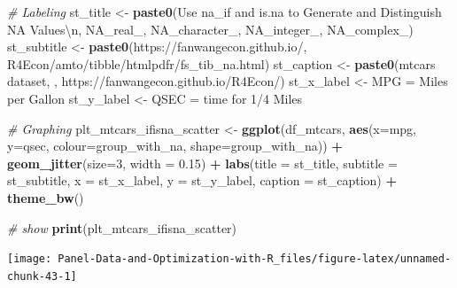 \documentclass[
]{book}
\newenvironment{Shaded}{\begin{snugshade}}{\end{snugshade}}
\newcommand{\CharTok}[1]{\textcolor[rgb]{0.31,0.60,0.02}{#1}}
\newcommand{\CommentTok}[1]{\textcolor[rgb]{0.56,0.35,0.01}{\textit{#1}}}
\newcommand{\DataTypeTok}[1]{\textcolor[rgb]{0.13,0.29,0.53}{#1}}
\newcommand{\DecValTok}[1]{\textcolor[rgb]{0.00,0.00,0.81}{#1}}
\newcommand{\FloatTok}[1]{\textcolor[rgb]{0.00,0.00,0.81}{#1}}
\newcommand{\KeywordTok}[1]{\textcolor[rgb]{0.13,0.29,0.53}{\textbf{#1}}}
\newcommand{\NormalTok}[1]{#1}
\newcommand{\OperatorTok}[1]{\textcolor[rgb]{0.81,0.36,0.00}{\textbf{#1}}}
\newcommand{\StringTok}[1]{\textcolor[rgb]{0.31,0.60,0.02}{#1}}
\begin{document}
\begin{Shaded}
\begin{Highlighting}[]
\CommentTok{\# Labeling}
\NormalTok{st\_title \textless{}{-}}\StringTok{ }\KeywordTok{paste0}\NormalTok{(}\StringTok{\textquotesingle{}Use na\_if and is.na to Generate and Distinguish NA Values}\CharTok{\textbackslash{}n}\StringTok{\textquotesingle{}}\NormalTok{,}
                   \StringTok{\textquotesingle{}NA\_real\_, NA\_character\_, NA\_integer\_, NA\_complex\_\textquotesingle{}}\NormalTok{)}
\NormalTok{st\_subtitle \textless{}{-}}\StringTok{ }\KeywordTok{paste0}\NormalTok{(}\StringTok{\textquotesingle{}https://fanwangecon.github.io/\textquotesingle{}}\NormalTok{,}
                      \StringTok{\textquotesingle{}R4Econ/amto/tibble/htmlpdfr/fs\_tib\_na.html\textquotesingle{}}\NormalTok{)}
\NormalTok{st\_caption \textless{}{-}}\StringTok{ }\KeywordTok{paste0}\NormalTok{(}\StringTok{\textquotesingle{}mtcars dataset, \textquotesingle{}}\NormalTok{,}
                     \StringTok{\textquotesingle{}https://fanwangecon.github.io/R4Econ/\textquotesingle{}}\NormalTok{)}
\NormalTok{st\_x\_label \textless{}{-}}\StringTok{ \textquotesingle{}MPG = Miles per Gallon\textquotesingle{}}
\NormalTok{st\_y\_label \textless{}{-}}\StringTok{ \textquotesingle{}QSEC = time for 1/4 Miles\textquotesingle{}}

\CommentTok{\# Graphing}
\NormalTok{plt\_mtcars\_ifisna\_scatter \textless{}{-}}\StringTok{ }
\StringTok{  }\KeywordTok{ggplot}\NormalTok{(df\_mtcars, }
         \KeywordTok{aes}\NormalTok{(}\DataTypeTok{x=}\NormalTok{mpg, }\DataTypeTok{y=}\NormalTok{qsec, }
             \DataTypeTok{colour=}\NormalTok{group\_with\_na, }
             \DataTypeTok{shape=}\NormalTok{group\_with\_na)) }\OperatorTok{+}
\StringTok{  }\KeywordTok{geom\_jitter}\NormalTok{(}\DataTypeTok{size=}\DecValTok{3}\NormalTok{, }\DataTypeTok{width =} \FloatTok{0.15}\NormalTok{) }\OperatorTok{+}
\StringTok{  }\KeywordTok{labs}\NormalTok{(}\DataTypeTok{title =}\NormalTok{ st\_title, }\DataTypeTok{subtitle =}\NormalTok{ st\_subtitle,}
       \DataTypeTok{x =}\NormalTok{ st\_x\_label, }\DataTypeTok{y =}\NormalTok{ st\_y\_label, }\DataTypeTok{caption =}\NormalTok{ st\_caption) }\OperatorTok{+}
\StringTok{  }\KeywordTok{theme\_bw}\NormalTok{()}

\CommentTok{\# show}
\KeywordTok{print}\NormalTok{(plt\_mtcars\_ifisna\_scatter)}
\end{Highlighting}
\end{Shaded}

\begin{center}\texttt{[image: Panel-Data-and-Optimization-with-R\_files/figure-latex/unnamed-chunk-43-1]} \end{center}
\end{document}
